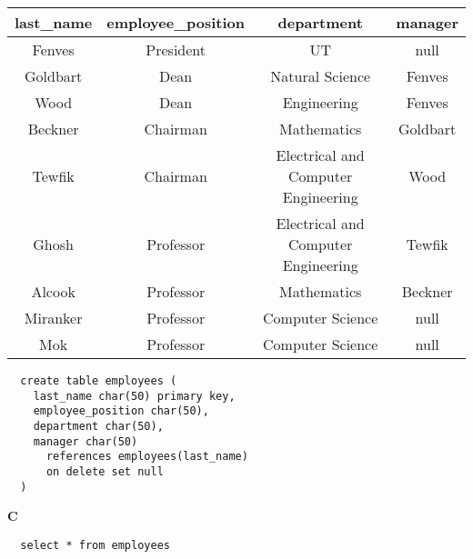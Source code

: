 \documentclass[12pt, letterpaper, fleqn]{article}
\begin{document}
\begin{center}
\begin{tabular} { c | c | c | c }
  last\_name & employee\_position & department & manager\\
  \hline
  Fenves                                            &	President
  &	UT                                              & null  \\
Goldbart                                          &	Dean
&	Natural Science                                   &	Fenves
\\
Wood                                              &	Dean
&	Engineering                                       &	Fenves
\\
Beckner                                           &	Chairman
&	Mathematics                                       &	Goldbart
\\
Tewfik                                            &	Chairman
&	Electrical and Computer Engineering               &	Wood
\\
Ghosh                                             &	Professor
&	Electrical and Computer Engineering               &	Tewfik
\\
Alcook                                            &	Professor
&	Mathematics                                       &	Beckner
\\
Miranker                                          &	Professor
&	Computer Science                                & null  \\
Mok                                               &	Professor
&	Computer Science                                & null  \\
\end{tabular}
\end{center}

\begin{verbatim}
  create table employees (
    last_name char(50) primary key,
    employee_position char(50),
    department char(50),
    manager char(50) 
      references employees(last_name)
      on delete set null 
  )
\end{verbatim}

  \textbf{C} \\
  \begin{verbatim}
  select * from employees
  \end{verbatim}
\end{document}
